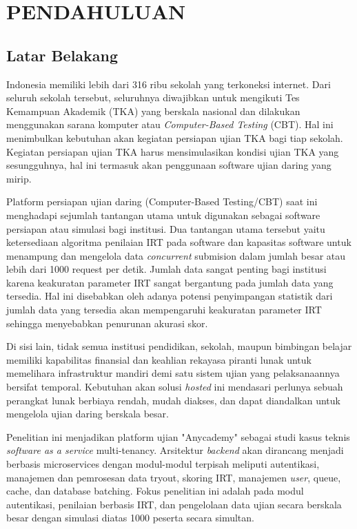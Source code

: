 \chapter{PENDAHULUAN}

\section{Latar Belakang}


Indonesia memiliki lebih dari 316 ribu sekolah yang terkoneksi internet\cite{indonesiabaikRibuSekolah}.
Dari seluruh sekolah tersebut, seluruhnya diwajibkan untuk mengikuti Tes Kemampuan Akademik (TKA) yang berskala nasional 
dan dilakukan menggunakan sarana komputer atau \emph{Computer-Based Testing} (CBT). Hal ini menimbulkan kebutuhan akan 
kegiatan persiapan ujian TKA bagi tiap sekolah. Kegiatan persiapan ujian TKA harus mensimulasikan kondisi 
ujian TKA yang sesungguhnya, hal ini termasuk akan penggunaan software ujian daring yang mirip.

Platform persiapan ujian daring (Computer-Based Testing/CBT) saat ini menghadapi sejumlah tantangan utama untuk digunakan 
sebagai software persiapan atau simulasi bagi institusi. Dua tantangan utama tersebut yaitu ketersediaan algoritma 
penilaian IRT pada software dan kapasitas software untuk menampung dan mengelola data \emph{concurrent} submision 
dalam jumlah besar atau lebih dari 1000 request per detik. Jumlah data sangat penting bagi institusi karena keakuratan 
parameter IRT sangat bergantung pada jumlah data yang tersedia. Hal ini disebabkan oleh adanya potensi penyimpangan 
statistik dari jumlah data yang tersedia akan mempengaruhi keakuratan parameter IRT sehingga menyebabkan
penurunan akurasi skor.

Di sisi lain, tidak semua institusi pendidikan, sekolah, maupun bimbingan belajar memiliki kapabilitas finansial dan
keahlian rekayasa piranti lunak untuk memelihara infrastruktur mandiri demi satu sistem ujian yang pelaksanaannya
bersifat temporal. Kebutuhan akan solusi \textit{hosted} ini mendasari perlunya sebuah perangkat lunak berbiaya rendah,
mudah diakses, dan dapat diandalkan untuk mengelola ujian daring berskala besar.

Penelitian ini menjadikan platform ujian "Anycademy" sebagai studi kasus teknis \emph{software as a service} multi-tenancy.
Arsitektur \textit{backend} akan dirancang menjadi berbasis microservices dengan modul-modul terpisah meliputi 
autentikasi, manajemen dan pemrosesan data tryout, skoring IRT, manajemen \emph{user}, queue, cache, dan database batching.
Fokus penelitian ini adalah pada modul autentikasi, penilaian berbasis IRT, dan pengelolaan data ujian secara berskala besar
dengan simulasi diatas 1000 peserta secara simultan. 

